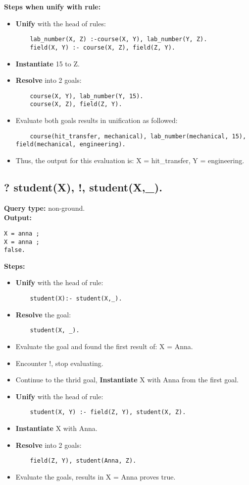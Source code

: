 \textbf{Steps when unify with rule:}
\begin{itemize}
    \item \textbf{Unify} with the head of rules:
    \begin{lstlisting}
    lab_number(X, Z) :-course(X, Y), lab_number(Y, Z).
    field(X, Y) :- course(X, Z), field(Z, Y).
    \end{lstlisting}
    \item \textbf{Instantiate} 15 to Z.
    \item \textbf{Resolve} into 2 goals:
    \begin{lstlisting}
    course(X, Y), lab_number(Y, 15).
    course(X, Z), field(Z, Y).
    \end{lstlisting}
\item Evaluate both goals results in unification as followed:
    \begin{lstlisting}
    course(hit_transfer, mechanical), lab_number(mechanical, 15), field(mechanical, engineering).
    \end{lstlisting}
\item Thus, the output for this evaluation is: X = hit\_transfer, Y = engineering.
\end{itemize}

\subsection{? student(X), !, student(X,\_). } 
\textbf{Query type: } non-ground. \\
\textbf{Output:} 
\begin{lstlisting}
X = anna ;
X = anna ;
false.
\end{lstlisting}
\textbf{Steps:}
\begin{itemize}
    \item \textbf{Unify} with the head of rule:
    \begin{lstlisting}
    student(X):- student(X,_).
    \end{lstlisting}
    \item \textbf{Resolve} the goal:
    \begin{lstlisting}
    student(X, _).
    \end{lstlisting}
\item Evaluate the goal and found the first result of: X = Anna.
\item Encounter !, stop evaluating.
\item Continue to the thrid goal, \textbf{Instantiate} X with Anna from the first goal.
\item \textbf{Unify} with the head of rule:
    \begin{lstlisting}
    student(X, Y) :- field(Z, Y), student(X, Z).
    \end{lstlisting}
\item \textbf{Instantiate} X with Anna.
\item \textbf{Resolve} into 2 goals:
    \begin{lstlisting}
    field(Z, Y), student(Anna, Z).
    \end{lstlisting}
\item Evaluate the goals, results in X = Anna proves true.
\end{itemize}

